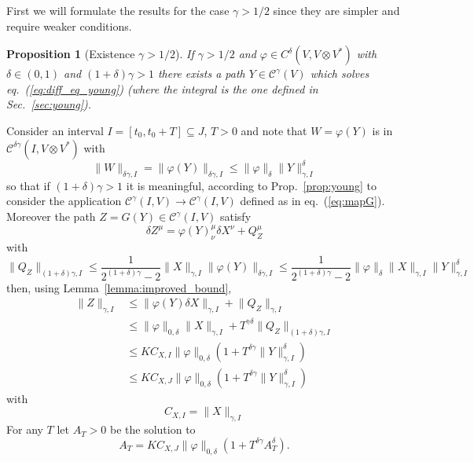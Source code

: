 \documentclass[a4paper,12pt,reqno]{amsproc}
\newcommand{\der}{\delta\!}
\newcommand{\CC}{\mathcal{C}}
\newcommand{\norm}[1]{\lVert #1\rVert}
\newtheorem{proposition}{Proposition}
\begin{document}
 First we will
formulate the results for the case $\gamma > 1/2$ since they are  simpler and
require weaker conditions.

\begin{proposition}[Existence $\gamma > 1/2$]
\label{eq:existence_young} If $\gamma > 1/2$ and $\varphi \in
C^\delta(V,V\otimes V^*)$ with $\delta \in (0,1)$ and $(1+\delta)\gamma > 1$ 
there exists a path $Y \in
\CC^\gamma(V)$ which solves eq.~(\ref{eq:diff_eq_young}) (where the
integral is the one defined in Sec.~\ref{sec:young}).    
\end{proposition}
\proof
Consider an interval $I=[t_0,t_0+T] \subseteq J$, $T>0$ and
note that $W = \varphi(Y)$ is  in $\CC^{\delta\gamma}(I,V\otimes
V^*)$ with
$$
\norm{W}_{\delta\gamma,I}= \norm{\varphi(Y)}_{\delta\gamma,I} \le \norm{\varphi}_{\delta}\norm{Y}_{\gamma,I}^\delta
$$
so that if $(1+\delta)\gamma > 1 $ it is meaningful, according to
Prop.~\ref{prop:young} to consider the application
$\CC^{\gamma}(I,V) \to \CC^{\gamma}(I,V)$ defined as in
eq.~(\ref{eq:mapG}). Moreover the path $Z = G(Y) \in \CC^\gamma(I,V)$
satisfy
\begin{equation*}
\der Z^\mu = \varphi(Y)^{\mu}_{\nu} \der X^\nu + Q^\mu_Z
\end{equation*}
with
$$
\norm{Q_Z}_{(1+\delta)\gamma,I} \le \frac{1}{2^{(1+\delta)\gamma}-2} \norm{X}_{\gamma,I}
\norm{\varphi(Y)}_{\delta \gamma,I} \le  \frac{1}{2^{(1+\delta)\gamma}-2} \norm{\varphi}_{\delta}  \norm{X}_{\gamma,I}\norm{Y}_{\gamma,I}^\delta
$$
then, using Lemma~\ref{lemma:improved_bound},
\begin{equation*}
  \begin{split}
\norm{Z}_{\gamma,I} & \le \norm{\varphi(Y) \der X}_{\gamma,I} + \norm{Q_Z}_{\gamma,I}
\\ & \le \norm{\varphi}_{0,\delta} \norm{X}_{\gamma,I} +
T^{\gamma\delta} \norm{Q_Z}_{(1+\delta)\gamma,I}
\\ & \le K C_{X,I} \norm{\varphi}_{0,\delta} (1+T^{\delta
  \gamma}\norm{Y}^\delta_{\gamma,I}) 
\\ & \le K C_{X,J} \norm{\varphi}_{0,\delta} (1+T^{\delta
  \gamma}\norm{Y}^\delta_{\gamma,I}) 
  \end{split}
\end{equation*}
with
$$
C_{X,I} = \norm{X}_{\gamma,I}
$$
For any $T$ let $A_T > 0$ be the solution to
\begin{equation}
  \label{eq:eqA}
 A_T = K C_{X,J} \norm{\varphi}_{0,\delta} (1+T^{\delta
  \gamma}A_T^\delta).
\end{equation}
\end{document}
